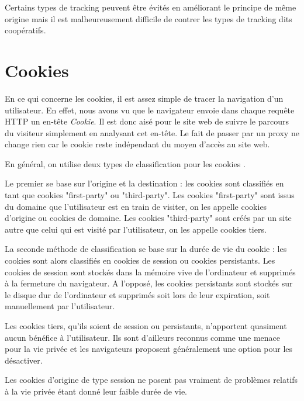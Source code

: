 Certains types de tracking peuvent être évités en améliorant le principe de même origine mais il est malheureusement difficile de contrer les types de tracking dits coopératifs.

\section{Cookies}
\label{cookies}
En ce qui concerne les cookies, il est assez simple de tracer la navigation d'un utilisateur. En effet, nous avons vu que le navigateur envoie dans chaque requête HTTP un en-tête \textit{Cookie}. Il est donc aisé pour le site web de suivre le parcours du visiteur simplement en analysant cet en-tête. Le fait de passer par un proxy ne change rien car le cookie reste indépendant du moyen d'accès au site web.
\newline

En général, on utilise deux types de classification pour les cookies \cite{Yue:2007:ACU:1251984.1253093}.

Le premier se base sur l'origine et la destination : les cookies sont classifiés en tant que cookies "first-party" ou "third-party". Les cookies "first-party" sont issus du domaine que l'utilisateur est en train de visiter, on les appelle cookies d'origine ou cookies de domaine. Les cookies "third-party" sont créés par un site autre que celui qui est visité par l'utilisateur, on les appelle cookies tiers.

La seconde méthode de classification se base sur la durée de vie du cookie : les cookies sont alors classifiés en cookies de session ou cookies persistants. Les cookies de session sont stockés dans la mémoire vive de l'ordinateur et supprimés à la fermeture du navigateur. A l'opposé, les cookies persistants sont stockés sur le disque dur de l'ordinateur et supprimés soit lors de leur expiration, soit manuellement par l'utilisateur.
\newline

Les cookies tiers, qu'ils soient de session ou persistants, n'apportent quasiment aucun bénéfice à l'utilisateur. Ils sont d'ailleurs reconnus comme une menace pour la vie privée et les navigateurs proposent généralement une option pour les désactiver.

Les cookies d'origine de type session ne posent pas vraiment de problèmes relatifs à la vie privée étant donné leur faible durée de vie.

